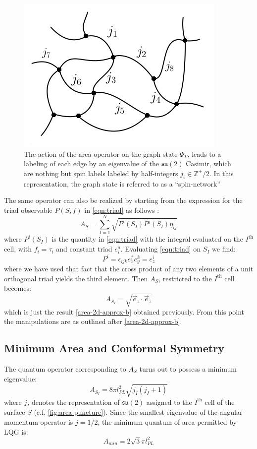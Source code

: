 \documentclass[submission, Phys]{SciPost}
\newcommand{\mbb}[1]{\mathbb{#1}}
\newcommand{\mf}[1]{\mathfrak{#1}}
\begin{document}
\begin{figure}[tbph]
\centering
\includegraphics[width=0.4\linewidth]{network-labelled-j}
\caption{The action of the area operator on the graph state $ \Psi_\Gamma $, leads to a labeling of each edge by an eigenvalue of the $ \mf{su}(2) $ Casimir, which are nothing but spin labels labeled by half-integers $ j_i \in \mbb{Z}^+/2 $. In this representation, the graph state is referred to as a ``spin-network''}
\label{fig:spin-state}
\end{figure}

The same operator can also be realized by starting from the expression for the triad observable $ P(S,f) $ in \eqref{eqn:triad} as follows \cite[Sec 5.1.1]{Ashtekar2004Background}:
\begin{equation}\label{eqn:area-observable}
	A_S = \sum_{I=1}^{N}\sqrt{P^i(S_I) P^j(S_I) \eta_{ij}}
\end{equation}
where $ P^i(S_I) $ is the quantity in \eqref{eqn:triad} with the integral evaluated on the $ I^\text{th} $ cell, with $ f_i = \tau_i $ and constant triad $ e^a_i $. Evaluating \eqref{eqn:triad} on $ S_I $ we find:
\begin{equation}\label{eqn:triad-2}
	P^i = \epsilon_{ijk} e_x^j e_y^k = e_z^i
\end{equation}
where we have used that fact that the cross product of any two elements of a unit orthogonal triad yields the third element. Then $ A_S $, restricted to the $ I^\text{th} $ cell becomes:
\begin{equation}\label{eqn:area-2}
	A_{S_I} = \sqrt{ \vec{e}_z \cdot \vec{e}_z }
\end{equation}
which is just the result \eqref{area-2d-approx-b} obtained previously. From this point the manipulations are as outlined after \eqref{area-2d-approx-b}.

\subsection{Minimum Area and Conformal Symmetry}\label{sec:conformal}

The quantum operator corresponding to $ A_S $ turns out to possess a minimum eigenvalue:
\begin{equation}\label{eqn:area-eigenvalue}
	A_{S_I} = 8\pi l^2_{PL} \sqrt{j_I (j_I + 1)}
\end{equation}
where $ j_I $ denotes the representation of $ \mf{su}(2) $ assigned to the $ I^{\text{th}} $ cell of the surface $ S $ (c.f. \autoref{fig:area-puncture}). Since the smallest eigenvalue of the angular momentum operator is $ j = 1/2 $, the minimum quantum of area permitted by LQG is:
\begin{equation}\label{eqn:area-minimum}
	A_{min} = 2 \sqrt{3} \pi l^2_{PL} 
\end{equation}
\end{document}
